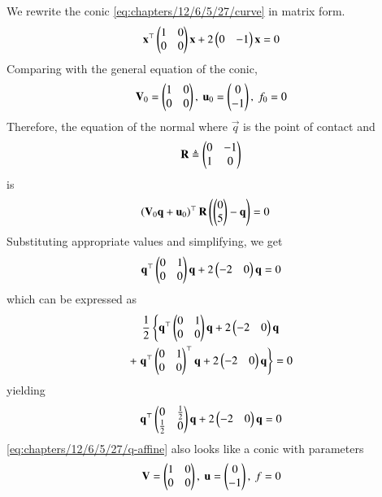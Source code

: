 		We rewrite the conic \eqref{eq:chapters/12/6/5/27/curve} in matrix form.
    \begin{align}
        \mathbf{x}^\top\begin{pmatrix}1&0\\0&0\end{pmatrix}\mathbf{x} + 2\begin{pmatrix}0&-1\end{pmatrix}\mathbf{x} = 0
        \label{eq:chapters/12/6/5/27/curve-mtx}
    \end{align}
    Comparing with the general equation of the conic,
    \begin{align}
        \vec{V}_0 = \myvec{1&0\\0&0},\
        \vec{u}_0 = \myvec{0\\-1},\ 
        f_0 = 0 
    \end{align}
    Therefore, the equation of the normal where $\vec{q}$ is the point of contact 
    and 
\begin{align}
    \mathbf{R} \triangleq \begin{pmatrix}0&-1\\1&0\end{pmatrix} 
\end{align}
is
    \begin{align}
	    \left(\mathbf{V}_0\mathbf{q}+\mathbf{u}_0\right)^\top\mathbf{R}\left(\begin{pmatrix}0\\5\end{pmatrix}-\mathbf{q}\right) &= 0
        \label{eq:chapters/12/6/5/27/normal}
    \end{align}
    Substituting appropriate values and simplifying, we get 
    \begin{align}
	    \mathbf{q}^\top\begin{pmatrix}0&1\\0&0\end{pmatrix}\mathbf{q} + 2\begin{pmatrix}-2 & 0\end{pmatrix}\mathbf{q}= 0
        \label{eq:chapters/12/6/5/27/q-eqn}
    \end{align}
    which can be expressed as 
    \begin{multline}
	    \frac{1}{2}\left\{
		    \mathbf{q}^\top\begin{pmatrix}0&1\\0&0\end{pmatrix}\mathbf{q} + 2\begin{pmatrix}-2 & 0\end{pmatrix}\mathbf{q}\right.
	\\
	    +
	    \left.
		    \mathbf{q}^\top\begin{pmatrix}0&1\\0&0\end{pmatrix}^\top\mathbf{q} + 2\begin{pmatrix}-2 & 0\end{pmatrix}\mathbf{q}\right\}= 0
    \end{multline}
    yielding
    \begin{align}
	    \mathbf{q}^\top\begin{pmatrix}0&\frac{1}{2}\\\frac{1}{2}&0\end{pmatrix}\mathbf{q} + 2\begin{pmatrix}-2 &0\end{pmatrix}\mathbf{q} = 0
        \label{eq:chapters/12/6/5/27/q-affine}
    \end{align}
        \eqref{eq:chapters/12/6/5/27/q-affine}
	also looks like a conic with parameters
    \begin{align}
        \vec{V} = \myvec{1&0\\0&0},\
        \vec{u} = \myvec{0\\-1},\ 
        f = 0 
    \end{align}
